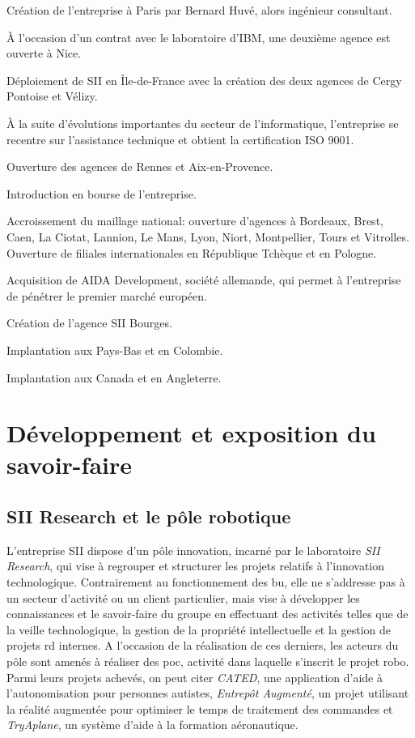 {{			\begin{description}
			{
				\item[1979:] Création de l'entreprise à Paris par Bernard Huvé, alors ingénieur consultant.
				\item[1984:] À l'occasion d'un contrat avec le laboratoire d'IBM, une deuxième agence est ouverte à Nice.
				\item[1987-1989:] Déploiement de SII en Île-de-France avec la création des deux agences de Cergy Pontoise et Vélizy.
				\item[1992:] À la suite d'évolutions importantes du secteur de l'informatique, l'entreprise se recentre sur l'assistance technique et obtient la certification ISO 9001.
				\item[1997:] Ouverture des agences de Rennes et Aix-en-Provence.
				\item[1999:] Introduction en bourse de l'entreprise.
				\item[2000-2007:] Accroissement du maillage national: ouverture d'agences à Bordeaux, Brest, Caen, La Ciotat, Lannion, Le Mans, Lyon, Niort, Montpellier, Tours et Vitrolles. Ouverture de filiales internationales en République Tchèque et en Pologne.
				\item[2010:] Acquisition de AIDA Development, société allemande, qui permet à l'entreprise de pénétrer le premier marché européen.
				\item[Août 2010:] Création de l'agence SII Bourges.
				\item[2015:] Implantation aux Pays-Bas et en Colombie.
				\item[2016:] Implantation aux Canada et en Angleterre.
			}
			\end{description}
	}
	\section{Développement et exposition du savoir-faire}
	
		\subsection{SII Research et le pôle robotique}
			
			\par
			{
				L'entreprise SII dispose d'un pôle innovation, incarné par le laboratoire \emph{SII Research}, qui vise à regrouper et structurer les projets relatifs à l'innovation technologique. Contrairement au fonctionnement des \gls{bu}, elle ne s'addresse pas à un secteur d'activité ou un client particulier, mais vise à développer les connaissances et le savoir-faire du groupe en effectuant des activités telles que de la veille technologique, la gestion de la propriété intellectuelle et la gestion de projets \gls{rd} internes. A l'occasion de la réalisation de ces derniers, les acteurs du pôle sont amenés à réaliser des \gls{poc}, activité dans laquelle s'inscrit le projet \gls{robo}. Parmi leurs projets achevés, on peut citer \emph{CATED}, une application d'aide à l'autonomisation pour personnes autistes, \emph{Entrepôt Augmenté}, un projet utilisant la réalité augmentée pour optimiser le temps de traitement des commandes et \emph{TryAplane}, un système d'aide à la formation aéronautique.
				
}}
